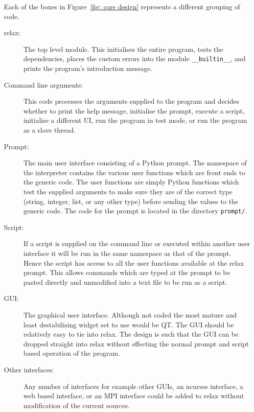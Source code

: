 Each of the boxes in Figure~\ref{fig: core design} represents a different grouping of code.
\begin{description}
\item[relax:]  The top level module.  This initialises the entire program, tests the dependencies, places the custom errors into the module \texttt{\_\_builtin\_\_}, and prints the program's introduction message.

\item[Command line arguments:]  This code processes the arguments supplied to the program and decides whether to print the help message, initialise the prompt, execute a script, initialise a different UI, run the program in test mode, or run the program as a slave thread.

\item[Prompt:]  The main user interface consisting of a Python prompt.  The namespace of the interpreter contains the various user functions which are front ends to the generic code.  The user functions are simply Python functions which test the supplied arguments to make sure they are of the correct type (string, integer, list, or any other type) before sending the values to the generic code.  The code for the prompt is located in the directory \texttt{prompt/}.

\item[Script:]  If a script is supplied on the command line or executed within another user interface it will be run in the same namespace as that of the prompt.  Hence the script has access to all the user functions available at the relax prompt.  This allows commands which are typed at the prompt to be pasted directly and unmodified into a text file to be run as a script.

\item[GUI:]  The graphical user interface.  Although not coded the most mature and least destabilising widget set to use would be QT.  The GUI should be relatively easy to tie into relax.  The design is such that the GUI can be dropped straight into relax without effecting the normal prompt and script based operation of the program.

\item[Other interfaces:]  Any number of interfaces for example other GUIs, an ncurses interface, a web based interface, or an MPI interface could be added to relax without modification of the current sources.


\end{description}
